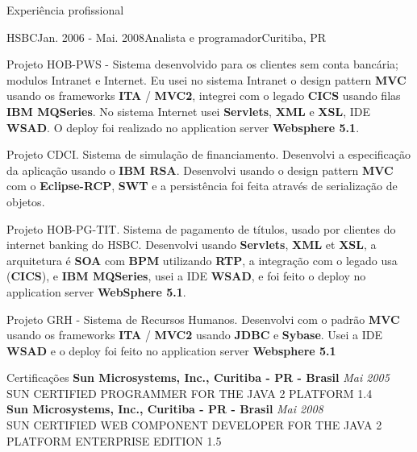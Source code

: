 \documentclass{resume}
\begin{document}
\begin{rSection}{Experiência profissional}
\begin{rSubsection}{HSBC}{Jan. 2006 - Mai. 2008}{Analista e programador}{Curitiba, PR}
    \item Projeto HOB-PWS - Sistema desenvolvido para os clientes sem conta bancária; modulos Intranet e Internet. Eu usei no sistema Intranet o design pattern \textbf{MVC} usando os frameworks \textbf{ITA} / \textbf{MVC2}, integrei com o legado \textbf{CICS} usando filas \textbf{IBM MQSeries}. No sistema Internet usei \textbf{Servlets}, \textbf{XML} e \textbf{XSL}, IDE \textbf{WSAD}. O deploy foi realizado no application server \textbf{Websphere 5.1}.\\
    \item Projeto CDCI. Sistema de simulação de financiamento. Desenvolvi a especificação da aplicação usando o \textbf{IBM RSA}. Desenvolvi usando o design pattern \textbf{MVC} com o \textbf{Eclipse-RCP}, \textbf{SWT} e a persistência foi feita através de serialização de objetos.\\
    \item Projeto HOB-PG-TIT. Sistema de pagamento de títulos, usado por clientes do internet banking do HSBC. Desenvolvi usando \textbf{Servlets}, \textbf{XML} et \textbf{XSL}, a arquitetura é \textbf{SOA} com \textbf{BPM} utilizando \textbf{RTP}, a integração com o legado usa (\textbf{CICS}), e \textbf{IBM MQSeries}, usei a IDE \textbf{WSAD}, e foi feito o deploy no application server \textbf{WebSphere 5.1}.\\
    \item Projeto GRH - Sistema de Recursos Humanos. Desenvolvi com o padrão \textbf{MVC} usando os frameworks \textbf{ITA} / \textbf{MVC2} usando \textbf{JDBC} e \textbf{Sybase}. Usei a IDE \textbf{WSAD} e o deploy foi feito no application server \textbf{Websphere 5.1}
    \end{rSubsection}
  \end{rSection}

  \begin{rSection}{Certificações}
    {\bf Sun Microsystems, Inc., Curitiba - PR - Brasil} \hfill {\em Mai 2005} \\ 
    {SUN CERTIFIED PROGRAMMER FOR THE JAVA 2 PLATFORM 1.4} \\

    {\bf Sun Microsystems, Inc., Curitiba - PR - Brasil} \hfill {\em Mai 2008} \\ 
    {SUN CERTIFIED WEB COMPONENT DEVELOPER FOR THE JAVA 2 PLATFORM ENTERPRISE EDITION 1.5} \\
  \end{rSection}
  
\end{document}
